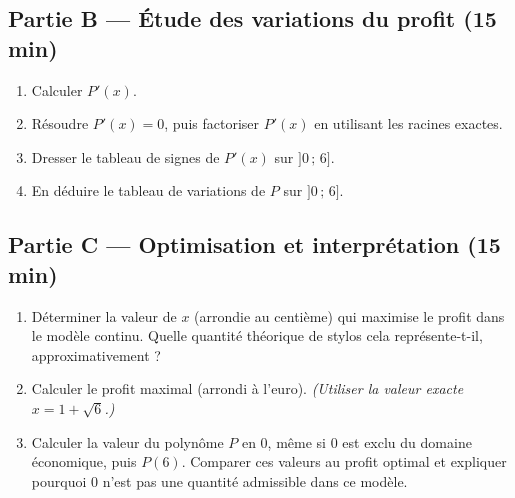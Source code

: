 
\bigskip

\subsection*{Partie B — Étude des variations du profit (15 min)}

\begin{enumerate}[resume]
  \item Calculer $P'(x)$.
  \item Résoudre $P'(x)=0$, puis factoriser $P'(x)$ en utilisant les racines exactes.
  \item Dresser le tableau de signes de $P'(x)$ sur $]0\,;\,6]$.
  \item En déduire le tableau de variations de $P$ sur $]0\,;\,6]$.
\end{enumerate}


\bigskip

\subsection*{Partie C — Optimisation et interprétation (15 min)}

\begin{enumerate}[resume]
  \item Déterminer la valeur de $x$ (arrondie au centième) qui maximise le profit dans le modèle continu. Quelle quantité théorique de stylos cela représente-t-il, approximativement ?
  \item Calculer le profit maximal (arrondi à l'euro). \textit{(Utiliser la valeur exacte $x = 1 + \sqrt{6}$.)}
  \item Calculer la valeur du polynôme $P$ en $0$, même si $0$ est exclu du domaine économique, puis $P(6)$. Comparer ces valeurs au profit optimal et expliquer pourquoi $0$ n'est pas une quantité admissible dans ce modèle.
\end{enumerate}

